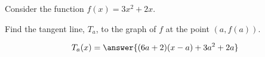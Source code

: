 \documentclass{ximera}
\author{Steven Gubkin}
\begin{document}
\begin{exercise}


Consider the function $f(x) = 3x^2 + 2x$.

Find the tangent line, $T_a$, to the graph of $f$ at the point $(a,f(a))$.

\begin{prompt}
	\[
	T_a(x) = \answer{(6a+2)(x-a)+3a^2+2a}
	\]
\end{prompt}




\end{exercise}
\end{document}
